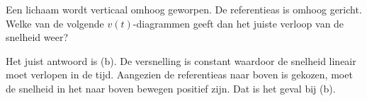 
\begin{exercise}



Een lichaam wordt verticaal omhoog geworpen. De referentieas is omhoog gericht. Welke van de volgende $v(t)$-diagrammen geeft dan het juiste verloop van de snelheid weer?
\begin{figure}[h]
\begin{flushright}
\end{flushright}
\end{figure}

\begin{oplossing}
Het juist antwoord is (b). De versnelling is constant waardoor de snelheid lineair moet verlopen in de tijd. Aangezien de referentieas naar boven is gekozen, moet de snelheid in het naar boven bewegen positief zijn. Dat is het geval bij (b).
\end{oplossing}

\end{exercise}

